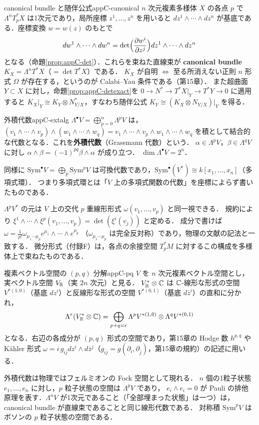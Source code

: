 \begin{myex}{canonical bundle と随伴公式}{appC-canonical}
$n$ 次元複素多様体 $X$ の各点 $p$ で $\Lambda^nT_p^*X$ は1次元であり，局所座標 $z^1,\dots,z^n$ を用いると
$dz^1\wedge\cdots\wedge dz^n$ が基底である．座標変換 $w=w(z)$ のもとで
\[
dw^1\wedge\cdots\wedge dw^n=\det\Bigl(\frac{\partial w^i}{\partial z^j}\Bigr)dz^1\wedge\cdots\wedge dz^n
\]
となる（命題\ref{prop:appC-det}）．これらを束ねた直線束が \textbf{canonical bundle} $K_X=\Lambda^nT^*X$（$=\det T^*X$）である．
$K_X$ が自明 $\iff$ 至る所消えない正則 $n$ 形式 $\Omega$ が存在する，というのが Calabi–Yau 条件である（第15章）．
また超曲面 $Y\subset X$ に対し，命題\ref{prop:appC-detexact}を $0\to N^*\to T^*X|_Y\to T^*Y\to0$ に適用すると
$K_X|_Y\cong K_Y\otimes N^*_{Y/X}$，すなわち随伴公式 $K_Y\cong(K_X\otimes N_{Y/X})|_Y$ を得る．
\end{myex}

\begin{mydef}{外積代数}{appC-extalg}
$\Lambda^\bullet V=\bigoplus_{p=0}^n\Lambda^pV$ は，
$(v_1\wedge\cdots\wedge v_p)\wedge(w_1\wedge\cdots\wedge w_q)=v_1\wedge\cdots\wedge v_p\wedge w_1\wedge\cdots\wedge w_q$
を積として結合的な代数となる．これを\textbf{外積代数}（Grassmann 代数）という．
$\alpha\in\Lambda^pV$，$\beta\in\Lambda^qV$ に対し $\alpha\wedge\beta=(-1)^{pq}\beta\wedge\alpha$ が成り立つ．
$\dim\Lambda^\bullet V=2^n$．
\end{mydef}

同様に $\mathrm{Sym}^\bullet V=\bigoplus_p\mathrm{Sym}^pV$ は可換代数であり，$\mathrm{Sym}^\bullet(V^*)\cong k[x_1,\dots,x_n]$（多項式環）．
つまり多項式環とは「$V$ 上の多項式関数の代数」を座標によらず書いたものである．

\begin{note}
$\Lambda^pV^*$ の元は $V$ 上の交代 $p$ 重線形形式 $\omega(v_1,\dots,v_p)$ と同一視できる．
規約により $\xi^1\wedge\cdots\wedge\xi^p(v_1,\dots,v_p)=\det(\xi^i(v_j))$ と定める．
成分で書けば $\omega=\frac1{p!}\omega_{\mu_1\cdots\mu_p}e^{\mu_1}\wedge\cdots\wedge e^{\mu_p}$
（$\omega_{\mu_1\cdots\mu_p}$ は完全反対称）であり，物理の文献の記法と一致する．
微分形式（付録F）は，各点の余接空間 $T_p^*M$ に対するこの構成を多様体上で束ねたものである．
\end{note}

\begin{myex}{複素ベクトル空間の $(p,q)$ 分解}{appC-pq}
$V$ を $n$ 次元複素ベクトル空間とし，実ベクトル空間 $V_{\mathbb{R}}$（実 $2n$ 次元）と見る．
$V_{\mathbb{R}}^*\otimes\mathbb{C}$ は $\mathbb{C}$-線形な形式の空間 $V^{*(1,0)}$（基底 $dz^i$）と反線形な形式の空間 $V^{*(0,1)}$（基底 $d\bar z^i$）の直和に分かれ，
\[
\Lambda^r(V_{\mathbb{R}}^*\otimes\mathbb{C})=\bigoplus_{p+q=r}\Lambda^pV^{*(1,0)}\otimes\Lambda^qV^{*(0,1)}
\]
となる．右辺の各成分が $(p,q)$ 形式の空間であり，第15章の Hodge 数 $h^{p,q}$ や Kähler 形式
$\omega=i\,g_{i\bar j}dz^i\wedge d\bar z^j$（$g_{i\bar j}=g(\partial_i,\partial_{\bar j})$，第15章の規約）の記述に用いる．
\end{myex}

\begin{physbox}[フェルミオンと外積]
外積代数は物理ではフェルミオンの Fock 空間として現れる．
$n$ 個の1粒子状態 $e_1,\dots,e_n$ に対し，$p$ 粒子状態の空間は $\Lambda^pV$ であり，
$e_i\wedge e_i=0$ が Pauli の排他原理を表す．$\Lambda^nV$ が1次元であること（「全部埋まった状態」は一つ）は，
canonical bundle が直線束であることと同じ線形代数である．
対称積 $\mathrm{Sym}^pV$ はボソンの $p$ 粒子状態の空間である．
\end{physbox}
